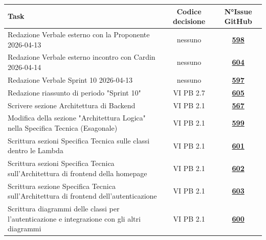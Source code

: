 \documentclass[a4paper,12pt]{article}
\newcommand{\ignoreglossary}{}
\begin{document}
\begin{center}
\small
\renewcommand{\arraystretch}{1.2} 
\begin{tabular}{|p{}|c|c|}
\hline
\rowcolor{gray!60} 
\textbf{Task} & \textbf{Codice decisione} & \textbf{N°Issue GitHub} \\
\hline
Redazione Verbale esterno con la Proponente 2026-04-13 & nessuno & \href{https://github.com/SWE-BitByBit/SWE-docs/issues/598}{\textbf{598}} \\
\hline
Redazione Verbale esterno incontro con Cardin 2026-04-14 & nessuno & \href{https://github.com/SWE-BitByBit/SWE-docs/issues/604}{\textbf{604}} \\
\hline
Redazione Verbale Sprint 10 2026-04-13 & nessuno & \href{https://github.com/SWE-BitByBit/SWE-docs/issues/597}{\textbf{597}} \\
\hline
Redazione riassunto di periodo "Sprint 10" & VI \ignoreglossary{PB} 2.7 & \href{https://github.com/SWE-BitByBit/SWE-docs/issues/605}{\textbf{605}} \\
\hline
[Specifica Tecnica] Scrivere sezione Architettura di Backend & VI \ignoreglossary{PB} 2.1 & \href{https://github.com/SWE-BitByBit/SWE-docs/issues/567}{\textbf{567}} \\
\hline
[Specifica Tecnica] Modifica della sezione "Architettura Logica" nella Specifica Tecnica (Esagonale) & VI \ignoreglossary{PB} 2.1 & \href{https://github.com/SWE-BitByBit/SWE-docs/issues/599}{\textbf{599}} \\
\hline
[Specifica Tecnica] Scrittura sezioni Specifica Tecnica sulle classi dentro le Lambda & VI \ignoreglossary{PB} 2.1 & \href{https://github.com/SWE-BitByBit/SWE-docs/issues/601}{\textbf{601}} \\
\hline
[Specifica Tecnica] Scrittura sezioni Specifica Tecnica sull'Architettura di frontend della homepage & VI \ignoreglossary{PB} 2.1 & \href{https://github.com/SWE-BitByBit/SWE-docs/issues/602}{\textbf{602}} \\
\hline
[Specifica Tecnica] Scrittura sezione Specifica Tecnica sull'Architettura di frontend dell'autenticazione & VI \ignoreglossary{PB} 2.1 & \href{https://github.com/SWE-BitByBit/SWE-docs/issues/603}{\textbf{603}} \\
\hline
Scrittura diagrammi delle classi per l'autenticazione e integrazione con gli altri diagrammi & VI \ignoreglossary{PB} 2.1 & \href{https://github.com/SWE-BitByBit/SWE-docs/issues/600}{\textbf{600}} \\
\hline

\end{tabular}
\end{center}
\end{document}
